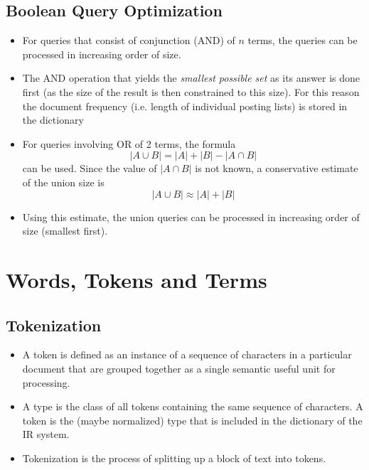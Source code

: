 \documentclass{article}
\begin{document}
\subsection{Boolean Query Optimization}
\begin{itemize}
    \item For queries that consist of conjunction (AND) of $n$ terms, the queries can be processed in increasing order of size.
    
    \item The AND operation that yields the \textit{smallest possible set} as its answer is done first (as the size of the result is then constrained to this size). For this reason the document frequency (i.e. length of individual posting lists) is stored in the dictionary
    
    \item For queries involving OR of 2 terms, the formula 
    \begin{equation*}
       | A \cup B |  = |A| + |B| - |A \cap B|
    \end{equation*}
    can be used. Since the value of $|A \cap B|$ is not known, a conservative estimate of the union size is 
    \begin{equation*}
       | A \cup B | \approx |A| + |B|
    \end{equation*}
    
    \item Using this estimate, the union queries can be processed in increasing order of size (smallest first). 
\end{itemize}

\section{Words, Tokens and Terms}
\subsection{Tokenization}
\begin{itemize}
    \item A token is defined as an instance of a sequence of characters 
    in a particular document that are grouped together as a single semantic useful unit for processing.
    
    \item A type is the class of all tokens containing the same sequence of characters. A token is the (maybe normalized) type that is included in the dictionary of the IR system. 
    
    \item Tokenization is the process of splitting up a block of text into tokens.
\end{itemize}
\end{document}
